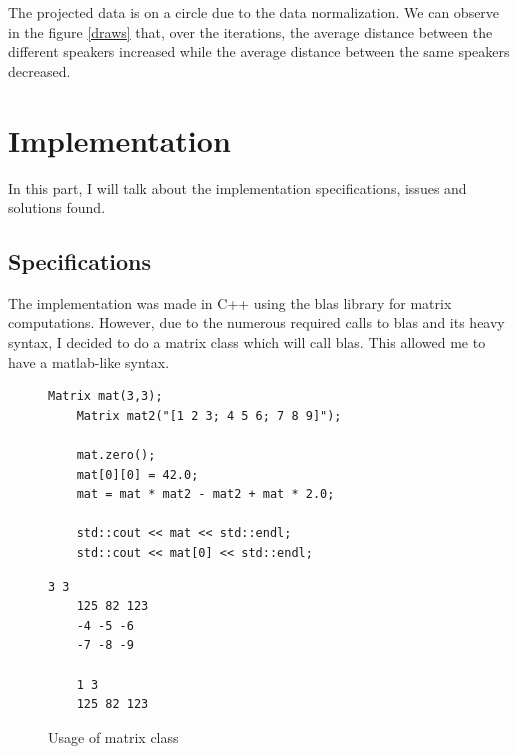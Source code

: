 \documentclass{techrep} %
\begin{document}
The projected data is on a circle due to the data normalization.  We can
observe in the figure \ref{draws} that, over the iterations, the
average distance between the different speakers increased while the
average distance between the same speakers decreased.

\section{Implementation}
In this part, I will talk about the implementation specifications,
issues and solutions found.

\subsection{Specifications}

The implementation was made in C++ using the blas library for matrix
computations.  However, due to the numerous required calls to blas and
its heavy syntax, I decided to do a matrix class which will call blas.
This allowed me to have a matlab-like syntax.



\lstset{language=c++}
\begin{figure}[H]
  \begin{lstlisting}[frame=single, caption=Source]
    Matrix mat(3,3);
    Matrix mat2("[1 2 3; 4 5 6; 7 8 9]");

    mat.zero();
    mat[0][0] = 42.0; 
    mat = mat * mat2 - mat2 + mat * 2.0;
    
    std::cout << mat << std::endl;
    std::cout << mat[0] << std::endl;
  \end{lstlisting}

  \begin{lstlisting}[frame=single, caption=Output]
    3 3
    125 82 123
    -4 -5 -6
    -7 -8 -9

    1 3
    125 82 123
  \end{lstlisting}
  \caption{Usage of matrix class}
  \label{algo_matrix}
\end{figure}
\end{document}
